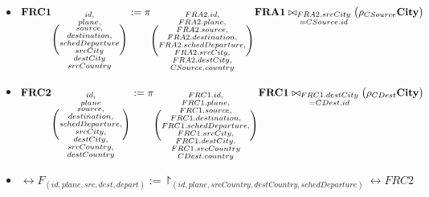 \begin{enumerate}[label=]
\begin{itemize}[label=]
        \item $
        \textbf{FRC1}_
        {\Bigg( \substack{id,\\ plane,  \\source,\\ destination,\\ schedDeparture \\ srcCity \\ destCity \\ srcCountry} 
        \Bigg)} 
        := 
        \pi_
        {\Bigg( \substack{FRA2.id,\\ FRA2.plane, \\  FRA2.source,\\ FRA2.destination,\\ FRA2.schedDeparture, \\ FRA2.srcCity, \\ FRA2.destCity, \\ CSource.country} \Bigg)} 
        \textbf{FRA1} 
        \bowtie_{\substack{FRA2.srcCity\\ = CSource.id}} 
        \big(\rho_{CSource} \textbf{City}\big)$

        \item $
        \textbf{FRC2}_
        {\Bigg( \substack{id,\\  plane \\ source,\\ destination,\\ schedDeparture, \\ srcCity, \\ destCity, \\ srcCountry, \\ destCountry} 
        \Bigg)} 
        := 
        \pi_
        {\Bigg( \substack{FRC1.id,\\ FRC1.plane, \\ FRC1.source,\\ FRC1.destination,\\ FRC1.schedDeparture, \\ FRC1.srcCity, \\ FRC1.destCity, \\ FRC1.srcCountry \\ CDest.country} \Bigg)} 
        \textbf{FRC1} 
        \bowtie_{\substack{FRC1.destCity\\ = CDest.id}} 
        \big(\rho_{CDest} \textbf{City}\big)$

        \item $\rel{F}_{(id, plane, src, dest, depart)} := \project_{(id, plane, srcCountry, destCountry, schedDeparture)} \rel{FRC2}$


\end{itemize}
\end{enumerate}
